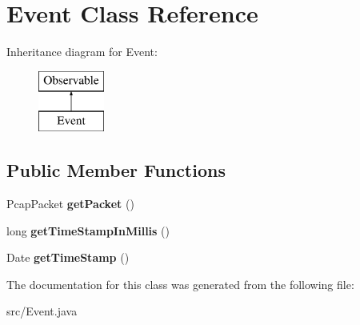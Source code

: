 \hypertarget{class_event}{\section{Event Class Reference}
\label{class_event}
}
Inheritance diagram for Event\-:\begin{figure}[H]
\begin{center}
\leavevmode
\includegraphics[height=2.000000cm]{class_event}
\end{center}
\end{figure}
\subsection*{Public Member Functions}
\begin{DoxyCompactItemize}
\item 
\hypertarget{class_event_ae136cad4600ea64e07cab62fd6a93b60}{Pcap\-Packet {\bfseries get\-Packet} ()}\label{class_event_ae136cad4600ea64e07cab62fd6a93b60}

\item 
\hypertarget{class_event_a6a2d84d2654abd587513672b8b9127db}{long {\bfseries get\-Time\-Stamp\-In\-Millis} ()}\label{class_event_a6a2d84d2654abd587513672b8b9127db}

\item 
\hypertarget{class_event_a4957820c452bcf147b8ad45be46a85d2}{Date {\bfseries get\-Time\-Stamp} ()}\label{class_event_a4957820c452bcf147b8ad45be46a85d2}

\end{DoxyCompactItemize}


The documentation for this class was generated from the following file\-:\begin{DoxyCompactItemize}
\item 
src/Event.\-java\end{DoxyCompactItemize}
